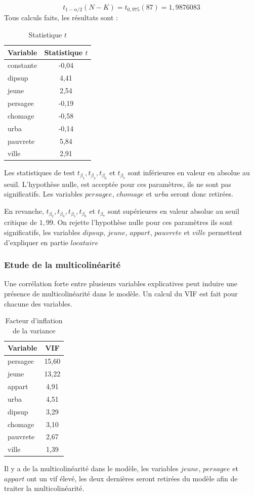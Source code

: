 \documentclass{article}
\begin{document}
\begin{equation*}
    t_{1-\alpha/2}(N-K) = t_{0,975}(87) = 1,9876083 
\end{equation*}
Tous calculs faits, les résultats sont :
\begin{table}[H]
\centering
\caption{Statistique $t$}
\begin{tabular}{l*{1}{c}}
\toprule
Variable            &Statistique $t$\\
\midrule
constante &     -0,04\\
dipsup&         4,41\\
jeune&          2,54\\
persagee&       -0,19\\
chomage&        -0,58\\
urba   &        -0,14\\
pauvrete&       5,84\\
ville &         2,91\\
\bottomrule
\end{tabular}
\end{table}
Les statistiques de test $t_{\beta_1},t_{\beta_4},t_{\beta_6}$ et $t_{\beta_7}$ sont inférieures en valeur en absolue au seuil. L'hypothèse nulle, est
acceptée pour ces paramètres, ils ne sont pas significatifs. Les variables $persagee$, $chomage$ et $urba$ seront donc retirées.

En revanche, $t_{\beta_2}, t_{\beta_3}, t_{\beta_5}, t_{\beta_8}$ et $t_{\beta_7}$ sont supérieures en valeur absolue au seuil critique de $1,99$. On rejette l'hypothèse nulle pour ces paramètres
ils sont significatifs, les variables $dipsup$, $jeune$, $appart$, $pauvrete$ et $ville$ permettent d'expliquer en partie $locataire$
\subsubsection{Etude de la multicolinéarité}
Une corrélation forte entre plusieurs variables explicatives peut induire une présence de multicolinéarité dans le modèle. Un calcul du VIF est fait pour chacune des variables.
\begin{table}[H]
\centering
\caption{Facteur d'inflation de la variance}
\begin{tabular}{l*{1}{c}}
\toprule
Variable            &         VIF\\
\midrule
persagee &     15,60  \\
jeune &    13,22 \\
appart &     4,91 \\
urba &    4,51\\
dipsup &   3,29\\
chomage &      3,10 \\
pauvrete &      2,67\\
ville &   1,39\\
\bottomrule
\end{tabular}
\end{table}
Il y a de la multicolinéarité dans le modèle, les variables $jeune$, $persagee$ et $appart$ ont un vif
élevé, les deux dernières seront retirées du modèle afin de traiter la multicolinéarité.
\end{document}
